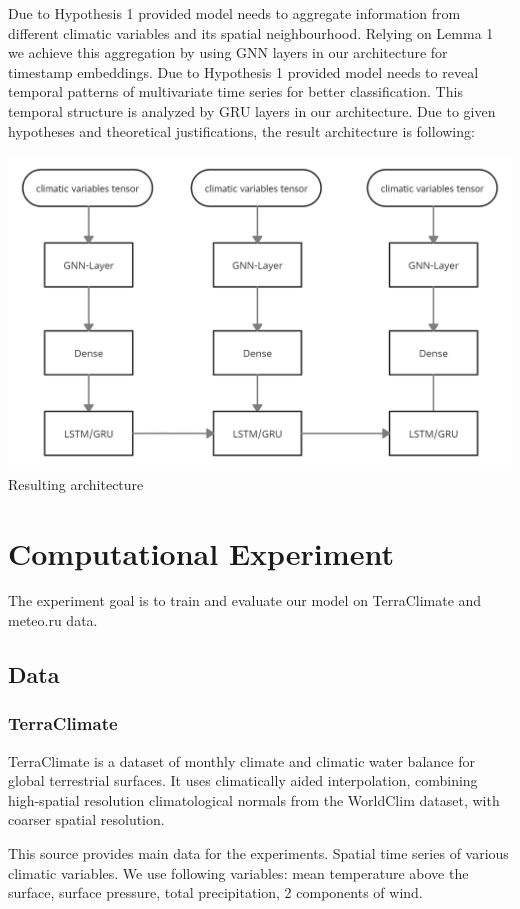 \documentclass{article}
\begin{document}
Due to Hypothesis 1 provided model needs to aggregate information from different climatic variables and its spatial neighbourhood. Relying on Lemma 1 we achieve this aggregation by using GNN layers in our architecture for timestamp embeddings. Due to Hypothesis 1 provided model needs to reveal temporal patterns of multivariate time series for better classification. This temporal structure is analyzed by GRU layers in our architecture. Due to given hypotheses and theoretical justifications, the result architecture is following:
\begin{center}
    \includegraphics[scale=0.19]{figures/HailNet architecture (1).png} \\ Resulting architecture
\end{center}


\newpage
\section{Computational Experiment}
The experiment goal is to train and evaluate our model on TerraClimate and meteo.ru data.
\subsection{Data}
\subsubsection{TerraClimate}
TerraClimate is a dataset of monthly climate and climatic water balance for global terrestrial surfaces. It uses climatically aided interpolation, combining high-spatial resolution climatological normals from the WorldClim dataset, with coarser spatial resolution.

This source provides main data for the experiments. Spatial time series of various 
climatic variables. We use following variables: mean temperature above the surface, surface pressure, total precipitation, 2 components of wind.
\end{document}
